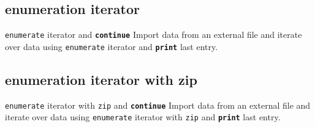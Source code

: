 \documentclass[t]{beamer}
\begin{document}
\subsection{enumeration iterator}
\begin{frame}{\texttt{enumerate} iterator and \texttt{\textbf{continue}}}
\small{Import data from an external file and iterate over data using \texttt{enumerate} iterator and \texttt{\textbf{print}}  last entry.}
  \begin{figure}[ht]
  \centering
        \lstset{numbers=left}
        
        
   \end{figure}
\end{frame}

\subsection{enumeration iterator with zip}
\begin{frame}{\texttt{enumerate} iterator with \texttt{zip} and \texttt{\textbf{continue}}}
\small{Import data from an external file and iterate over data using \texttt{enumerate} iterator with \texttt{zip} and \texttt{\textbf{print}}  last entry.}
  \begin{figure}[ht]
  \centering
        \lstset{numbers=left}
        
        
   \end{figure}
\end{frame}
\end{document}
